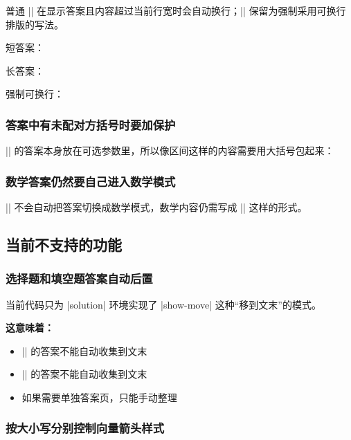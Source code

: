 普通 |\fillin| 在显示答案且内容超过当前行宽时会自动换行；|\fillin*| 保留为强制采用可换行排版的写法。

\begin{latexcode}
  短答案：\fillin[42]

  长答案：

  强制可换行：\fillin*[短答案]
\end{latexcode}

\subsubsection{答案中有未配对方括号时要加保护}

|\fillin| 的答案本身放在可选参数里，所以像区间这样的内容需要用大括号包起来：

\begin{latexcode}
  \fillin[[2,3)]

  \fillin[{$[2,3)$}]
\end{latexcode}

\subsubsection{数学答案仍然要自己进入数学模式}

|\fillin| 不会自动把答案切换成数学模式，数学内容仍需写成 |\fillin[$x^2+1$]| 这样的形式。


\subsection{当前不支持的功能}

\subsubsection{选择题和填空题答案自动后置}

当前代码只为 |solution| 环境实现了 |show-move| 这种“移到文末”的模式。

\textbf{这意味着：}
\begin{itemize}
  \item |\paren| 的答案不能自动收集到文末
  \item |\fillin| 的答案不能自动收集到文末
  \item 如果需要单独答案页，只能手动整理
\end{itemize}

\subsubsection{按大小写分别控制向量箭头样式}

